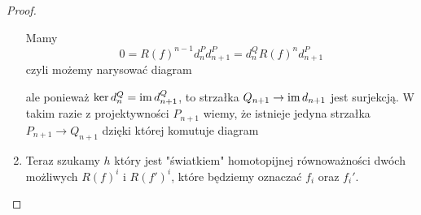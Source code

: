 \begin{proof}
\begin{enumerate}[label=(\alph*)]
{  Mamy 
  $$0=R(f)^{n-1}d_n^Pd_{n+1}^P=d_n^QR(f)^nd_{n+1}^P$$
  czyli możemy narysować diagram 
  \begin{center}\end{center}
  ale ponieważ $\ker d_n^Q=\operatorname{im} d_{n+1}^Q$, to strzałka $Q_{n+1}\to \operatorname{im} d_{n+1}$ jest surjekcją. W takim razie z projektywności $P_{n+1}$ wiemy, że istnieje jedyna strzałka $P_{n+1}\to Q_{n+1}$ dzięki której komutuje diagram 
  \begin{center}\end{center}
  
  
}
  \item Teraz szukamy $h$ który jest "światkiem" homotopijnej równoważności dwóch możliwych $R(f)^i$ i $R(f')^i$, które będziemy oznaczać $f_i$ oraz $f_i'$.
    \begin{center}\end{center}


\end{enumerate}
\end{proof}
